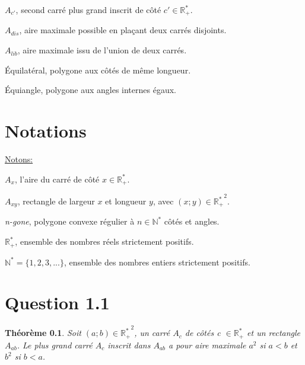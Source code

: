 \documentclass[]{amsart}
\theoremstyle{definition}
\theoremstyle{remark}
\numberwithin{equation}{section}
\begin{document}
$A_{c'}$, \hspace{1.9cm}second carré plus grand inscrit de côté $c' \in \mathbb{R_{+}^{\ast}}$.

$A_{dis}$, \hspace{1.7cm}aire maximale possible en plaçant deux carrés disjoints.

$A_{lib}$, \hspace{1.8cm}aire maximale issu de l’union de deux carrés.

Équilatéral, \hspace{0.7cm}polygone aux côtés de même longueur.

Équiangle, \hspace{0.9cm}polygone aux angles internes égaux.
\section*{Notations}
\begin{center}
\underline{Notons:}
\end{center}

$A_x$, \hspace{2.3cm}l'aire du carré de côté $x \in \mathbb{R_{+}^{\ast}}$.

$A_{xy}$, \hspace{2.1cm}rectangle de largeur $x$ et longueur $y$, avec $ (x;y) \in \mathbb{R_{+}^{\ast}}^2$.

\emph{n-gone}, \hspace{1.7cm}polygone convexe régulier à $n \in \mathbb{N_{}^{\ast}}$ côtés et angles.

$\mathbb{R_{+}^{\ast}}$, \hspace{2.2cm}ensemble des nombres réels strictement positifs.

$\mathbb{N_{}^{\ast}} = \{1,2,3,...\}$, \hspace{0.2cm}ensemble des nombres entiers strictement positifs.

\clearpage
\section*{Question 1.1}

\textbf{Théorème 0.1}. \emph{Soit $(a;b) \in \mathbb{R_{+}^{\ast}}^2$, un carré $A_c$ de côtés c $\in \mathbb{R_{+}^{\ast}}$ et un rectangle $A_{ab}$. Le plus grand carré $A_c$ inscrit dans $A_{ab}$ a pour aire maximale $a^2$ si $a<b$ et $b^2$ si $b<a$.}
\end{document}
